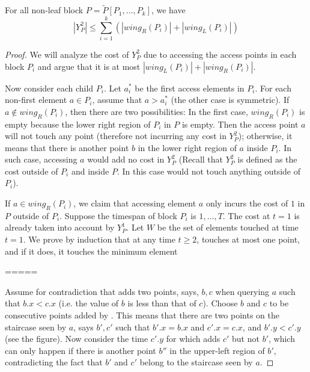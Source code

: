 \begin{lemma}
For all non-leaf block $P= \tilde P[P_1,\ldots, P_k]$, we have  
$$|Y_P^2| \leq \sum_{i=1}^k (|wing_R(P_i)| + |wing_L(P_i)|) $$ 
\end{lemma} 
\begin{proof}
We will analyze the cost of $Y_P^2$ due to accessing the access points in each block $P_i$ and argue that it is at most $|wing_L(P_i)| + |wing_R(P_i)|$.

Now consider each child $P_i$. 
Let $a_{i}^{*}$ be the first access elements in $P_{i}$. 
For each non-first element $a \in P_i$, assume that $a > a_i^*$ (the other case is symmetric). 
If $a\notin wing_{R}(P_{i})$, then there are two possibilities: In the first case, $wing_R(P_i)$ is empty because the lower right region of $P_i$ in $P$ is empty. Then the access point $a$ will not touch any point (therefore not incurring any cost in $Y_P^2$); otherwise, it means that there is another point $b$ in the lower right region of $a$ inside $P_i$. 
In such case, accessing $a$ would add no cost in $Y_P^2$ (Recall that $Y_P^2$ is defined as the cost outside of $P_i$ and inside $P$. In this case \greedy would not touch anything outside of $P_i$).  

If $a\in wing_{R}(P_{i})$, we claim that accessing element $a$ only incurs the cost of $1$ in $P$ outside of $P_i$. 
Suppose the timespan of block $P_i$ is $1,\ldots, T$. 
The cost at $t=1$ is already taken into account by $Y_P^1$. Let $W$ be the set of elements touched at time $t=1$.  
We prove by induction that at any time $t\geq 2$, \greedy touches at most one point, and if it does, it touches the minimum element   

===== 


Assume for contradiction that \greedy adds two points, says, $b, c$ when querying $a$ such that $b.x < c.x$ (i.e. the value of $b$ is less than that of $c$). Choose $b$ and $c$ to be consecutive points added by \greedy.  
This means that there are two points on the staircase seen by $a$, says $b', c'$ such that $b'.x = b.x$ and $c'.x = c.x$, and $b'.y < c'.y$ (see the figure).  
Now consider the time $c'.y$ for which \greedy adds $c'$ but not $b'$, which can only happen if there is another point $b''$ in the upper-left region of $b'$, contradicting the fact that $b'$ and $c'$ belong to the staircase seen by $a$.   


\end{proof}


